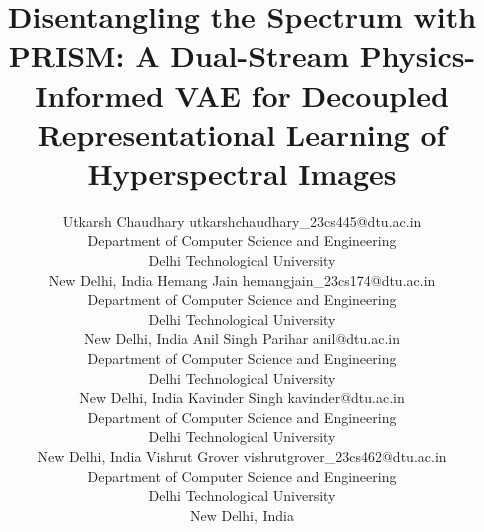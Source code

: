 \documentclass[twoside,11pt]{article}
\begin{document}
\title{Disentangling the Spectrum with PRISM: A Dual-Stream Physics-Informed VAE for Decoupled Representational Learning of Hyperspectral Images}

\author{\name Utkarsh Chaudhary \email utkarshchaudhary_23cs445@dtu.ac.in \\
       \addr Department of Computer Science and Engineering\\
       Delhi Technological University\\
       New Delhi, India
       \AND
       \name Hemang Jain \email hemangjain_23cs174@dtu.ac.in \\
       \addr Department of Computer Science and Engineering\\
       Delhi Technological University\\
       New Delhi, India
       \AND
       \name Anil Singh Parihar \email anil@dtu.ac.in \\
       \addr Department of Computer Science and Engineering\\
       Delhi Technological University\\
       New Delhi, India
       \AND
       \name Kavinder Singh \email kavinder@dtu.ac.in \\
       \addr Department of Computer Science and Engineering\\
       Delhi Technological University\\
       New Delhi, India
       \AND
       \name Vishrut Grover \email vishrutgrover_23cs462@dtu.ac.in \\
       \addr Department of Computer Science and Engineering\\
       Delhi Technological University\\
       New Delhi, India
}

\maketitle
\end{document}
